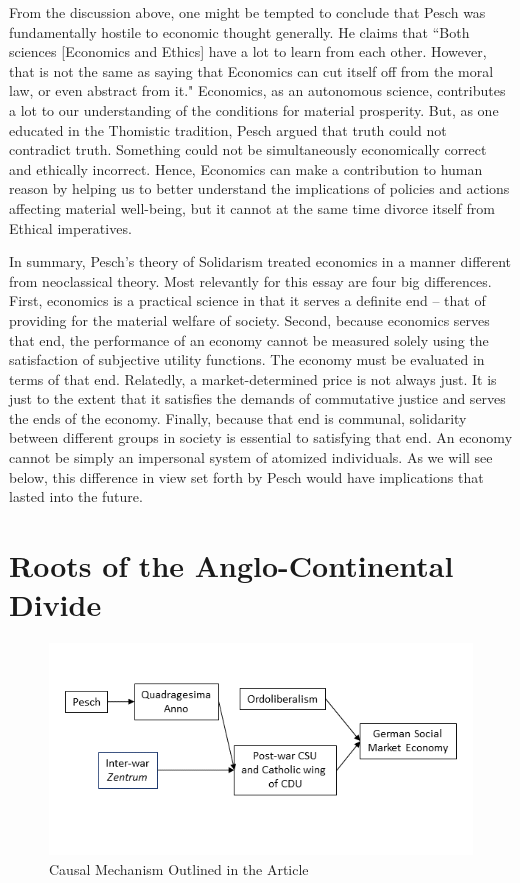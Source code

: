 \documentclass{article}
\begin{document}
From the discussion above, one might be tempted to conclude that Pesch was fundamentally hostile to economic thought generally.  He claims that ``Both sciences [Economics and Ethics] have a lot to learn from each other.  However, that is not the same as saying that Economics can cut itself off from the moral law, or even abstract from it." \citep[chap. 10]{pesch2004}  Economics, as an autonomous science, contributes a lot to our understanding of the conditions for material prosperity.  But, as one educated in the Thomistic tradition, Pesch argued that truth could not contradict truth.  Something could not be simultaneously economically correct and ethically incorrect.  Hence, Economics can make a contribution to human reason by helping us to better understand the implications of policies and actions affecting material well-being, but it cannot at the same time divorce itself from Ethical imperatives.\medskip

In summary, Pesch’s theory of Solidarism treated economics in a manner different from neoclassical theory.  Most relevantly for this essay are four big differences.  First, economics is a practical science in that it serves a definite end – that of providing for the material welfare of society.  Second, because economics serves that end, the performance of an economy cannot be measured solely using the satisfaction of subjective utility functions.  The economy must be evaluated in terms of that end.  Relatedly, a market-determined price is not always just.  It is just to the extent that it satisfies the demands of commutative justice and serves the ends of the economy.  Finally, because that end is communal, solidarity between different groups in society is essential to satisfying that end.  An economy cannot be simply an impersonal system of atomized individuals.  As we will see below, this difference in view set forth by Pesch would have implications that lasted into the future.

\section{Roots of the Anglo-Continental Divide}

\begin{figure}
    \centering
    \includegraphics{Figure1.png}
    \caption{Causal Mechanism Outlined in the Article}
    \label{fig:causalmechanism}
\end{figure}
\end{document}
